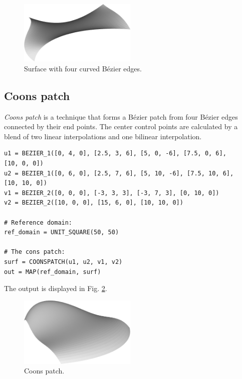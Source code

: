 \begin{figure}[!ht]
\begin{center}
\includegraphics[width=0.5\textwidth]{img/bezi.png}
\end{center}
\vspace{-4mm}
\caption{Surface with four curved B\'ezier edges.}
\label{fig:bezi}
\end{figure}

\subsection{Coons patch}

{\em Coons patch} is a technique that forms a B\'ezier patch from four B\'ezier edges connected 
by their end points. The center control 
points are calculated by a blend of two linear interpolations and one bilinear interpolation.\\

\begin{bbox}
\begin{verbatim}
u1 = BEZIER_1([0, 4, 0], [2.5, 3, 6], [5, 0, -6], [7.5, 0, 6], 
[10, 0, 0])
u2 = BEZIER_1([0, 6, 0], [2.5, 7, 6], [5, 10, -6], [7.5, 10, 6], 
[10, 10, 0])
v1 = BEZIER_2([0, 0, 0], [-3, 3, 3], [-3, 7, 3], [0, 10, 0])
v2 = BEZIER_2([10, 0, 0], [15, 6, 0], [10, 10, 0])

# Reference domain:
ref_domain = UNIT_SQUARE(50, 50)

# The cons patch:
surf = COONSPATCH(u1, u2, v1, v2)
out = MAP(ref_domain, surf)
\end{verbatim}
\end{bbox}
\vspace{6mm}

\noindent
The output is displayed in Fig. \ref{fig:curves-3}.

\begin{figure}[!ht]
\begin{center}
\includegraphics[width=0.5\textwidth]{img/curves-3.png}
\end{center}
\vspace{-4mm}
\caption{Coons patch.}
\label{fig:curves-3}
\end{figure}

